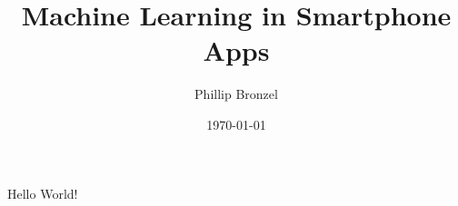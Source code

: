 \documentclass[twoside]{article}
\title{Machine Learning in Smartphone Apps}
\date{\today}
\author{Phillip Bronzel}
\begin{document}
  \maketitle
  \newpage
  \tableofcontents
  \newpage

  Hello World!
\end{document}
